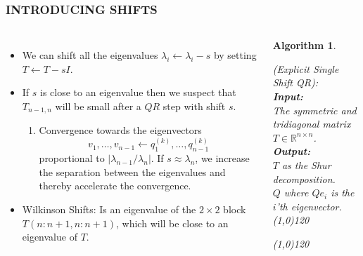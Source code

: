 \documentclass[a4paper,8pt]{beamer} %
\newtheorem{algo}{Algorithm}%
\begin{document}
\begin{frame}  %
\frametitle{INTRODUCING SHIFTS}
\begin{columns}

\column{7cm}
\begin{itemize}
	\item We can shift all the eigenvalues $\lambda_i\gets\lambda_{i}-s$ 
	by setting $T\gets T-sI$.
	\item 
	If $s$ is close to an eigenvalue then we suspect that 
	$T_{n-1,n}$ will be small after a $QR$ step with shift $s$. 
	\begin{enumerate}
	\item
	Convergence towards the eigenvectors 
	\begin{equation}
		v_1,\dots,v_{n-1} \gets
		q^{(k)}_1,\dots,q^{(k)}_{n-1}
	\end{equation}
	proportional to $|\lambda_{n-1}/\lambda_{n}|$.
	If $s\approx\lambda_{n}$, we increase the separation 
	between the eigenvalues and thereby accelerate the convergence. 
	\end{enumerate}
	\item Wilkinson Shifts: Is an eigenvalue of the $2\times2$ block $T(n:n+1, n:n+1)$, which
	will be close to an eigenvalue of $T$. %
\end{itemize}

\column{5cm}
%
%
\begin{algo}
\begin{footnotesize}
{
%
	(Explicit Single Shift QR):
%
}\\
\textbf{Input: }
{
%
	\\The symmetric and tridiagonal matrix $T\in\mathbb R^{n\times n}$.
%
}\\
\textbf{Output: }
{
%
	\\$T$ as the Shur decomposition.
	\\$Q$ where $Qe_i$ is the $i$'th eigenvector.
%
}\\
\line(1,0){120}
\begin{algorithmic}
%
\EndFor{}
%
\end{algorithmic}
\label{algQRSingleShiflExplicit}
\line(1,0){120}
\end{footnotesize}
\end{algo}
%
\end{columns}
\end{frame} %
\end{document}
